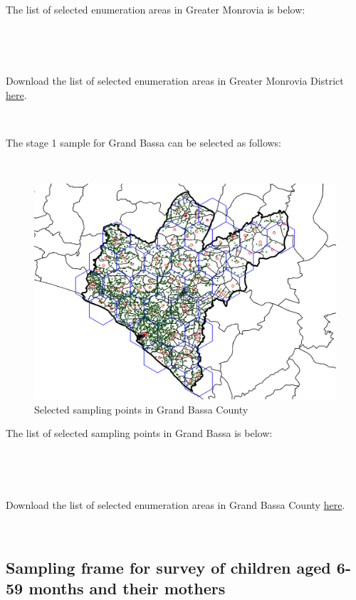 \documentclass[12pt,a4paper]{book}
\theoremstyle{definition}
\theoremstyle{definition}
\theoremstyle{definition}
\theoremstyle{remark}
\let\BeginKnitrBlock\begin \let\EndKnitrBlock\end
\begin{document}
~

The list of selected enumeration areas in Greater Monrovia is below:

~

~

\BeginKnitrBlock{rmddownload}
Download the list of selected enumeration areas in Greater Monrovia
District \href{data/greaterMonroviaSPlist.csv}{here}.
\EndKnitrBlock{rmddownload}

~

The stage 1 sample for Grand Bassa can be selected as follows:

~

\begin{figure}[H]

\includegraphics{figures/sample25-1} \hfill{}

\caption{Selected sampling points in Grand Bassa County}\label{fig:sample25}
\end{figure}

\newpage

The list of selected sampling points in Grand Bassa is below:

~

~

\BeginKnitrBlock{rmddownload}
Download the list of selected enumeration areas in Grand Bassa County
\href{data/grandBassaSPlist.csv}{here}.
\EndKnitrBlock{rmddownload}

~

\hypertarget{sampling-frame-for-survey-of-children-aged-6-59-months-and-their-mothers}{%
\subsection{Sampling frame for survey of children aged 6-59 months and
their
mothers}\label{sampling-frame-for-survey-of-children-aged-6-59-months-and-their-mothers}}
\end{document}
